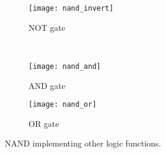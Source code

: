 \documentclass{article}
\begin{document}
\begin{figure}[hbtp]
  \centering
  \begin{subfigure}[b]{0.4\textwidth}
    \texttt{[image: nand\_invert]}
    \caption{\label{fig:nand-invert} NOT gate}
  \end{subfigure}%
  ~
  \begin{subfigure}[t]{0.5\textwidth}
    \texttt{[image: nand\_and]}
    \caption{\label{fig:nand_and} AND gate}
  \end{subfigure}
  \begin{subfigure}[b]{0.5\textwidth}
    \texttt{[image: nand\_or]}
    \caption{\label{fig:nand_or} OR gate}
    \end{subfigure}
  \caption{\label{fig:nand_gates} NAND implementing other logic functions.}
\end{figure}
\end{document}
